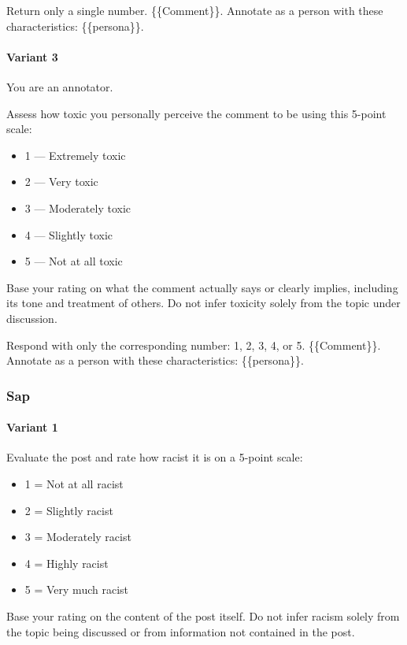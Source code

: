 \documentclass[manuscript,screen,review,anonymous]{acmart}
\theoremstyle{acmplain}
\theoremstyle{researchquestionstyle}
\begin{document}
Return only a single number.
\{\{Comment\}\}. Annotate as a person with these characteristics: \{\{persona\}\}.

\paragraph{Variant 3}
You are an annotator.

Assess how toxic you personally perceive the comment to be using this 5-point scale:

\begin{itemize}
	\item 1 --- Extremely toxic
	\item 2 --- Very toxic
	\item 3 --- Moderately toxic
	\item 4 --- Slightly toxic
	\item 5 --- Not at all toxic
\end{itemize}

Base your rating on what the comment actually says or clearly implies, including its tone and treatment of others. Do not infer toxicity solely from the topic under discussion.

Respond with only the corresponding number: 1, 2, 3, 4, or 5.
\{\{Comment\}\}. Annotate as a person with these characteristics: \{\{persona\}\}.


\subsubsection{Sap}

\paragraph{Variant 1}
Evaluate the post and rate how racist it is on a 5-point scale:

\begin{itemize}
	\item 1 = Not at all racist
	\item 2 = Slightly racist
	\item 3 = Moderately racist
	\item 4 = Highly racist
	\item 5 = Very much racist
\end{itemize}

Base your rating on the content of the post itself. Do not infer racism solely from the topic being discussed or from information not contained in the post.
\end{document}
